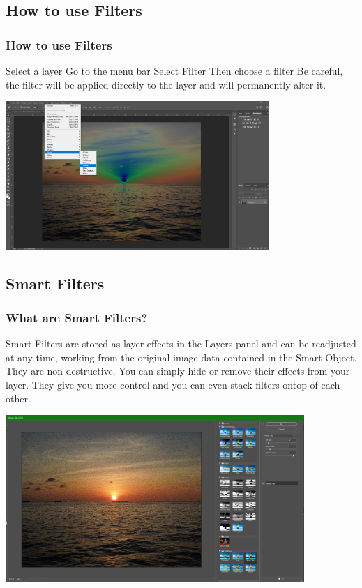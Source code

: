 \documentclass{beamer}
\begin{document}
\subsection{How to use Filters}	
\begin{frame}
	\frametitle{How to use Filters}
	\begin{outline}
		\1 Select a layer
		\1 Go to the menu bar
		\2 Select Filter
		\2 Then choose a filter
		\1 Be careful, the filter will be applied directly to the layer and will permanently alter it.  
	\end{outline}
	\begin{center}
		\includegraphics[width = 0.75\textwidth]{images/apply filter.png}
	\end{center}
\end{frame}

\subsection{Smart Filters}	
\begin{frame}
	\frametitle{What are Smart Filters?}
	\begin{outline}
		\1 Smart Filters are stored as layer effects in the Layers panel and can be readjusted at any time, working from the original image data contained in the Smart Object.
		\1 They are non-destructive.
		\2 You can simply hide or remove their effects from your layer.
		\1 They give you more control and you can even stack filters ontop of each other.
	\end{outline}
	\begin{center}
		\includegraphics[width = 0.85\textwidth]{images/smart filters.png}
	\end{center}
\end{frame}
\end{document}
